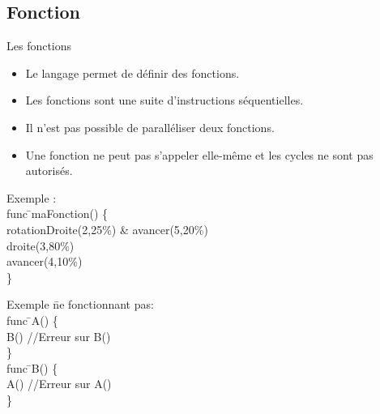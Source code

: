 \documentclass{bredelebeamer}
\begin{document}
	\subsection{Fonction} 
\begin{frame}{Les fonctions} 
\begin{itemize}
\item Le langage permet de définir des fonctions.
\item Les fonctions sont une suite d'instructions séquentielles.
\item Il n'est pas possible de paralléliser deux fonctions.
\item Une fonction ne peut pas s'appeler elle-même et les cycles ne sont pas autorisés.
\end{itemize}


\begin{tabbing}
Exemple : \=\\
	\>\color{Framarouge}func \=\color{black}maFonction\color{Framarouge}() \{\\ 
	\>\>\color{Framarouge}rotationDroite(\color{black}2\color{Framarouge},\color{Framagris}25\%\color{Framarouge}) \& 
	\color{Framarouge}avancer(\color{black}5\color{Framarouge},\color{Framagris}20\%\color{Framarouge})\\ 
	\>\>\color{Framarouge}droite(\color{black}3\color{Framarouge},\color{Framagris}80\%\color{Framarouge})\\ 
	\>\>\color{Framarouge}avancer(\color{black}4\color{Framarouge},\color{Framagris}10\%\color{Framarouge})\\ 
	\>\color{Framarouge}\}
\end{tabbing}
\begin{tabbing}
Exemple \=ne fonctionnant pas: \\
	\>\color{Framarouge}func \=\color{black}A\color{Framarouge}() \{\\ 
	\>\>\color{Framarouge}B() \color{black} //Erreur sur B() \\
	\>\color{Framarouge}\} \\
	\>\color{Framarouge}func \=\color{black}B\color{Framarouge}() \{\\ 
	\>\>\color{Framarouge}A()  \color{black} //Erreur sur A()\\
	\>\color{Framarouge}\}
\end{tabbing}

\end{frame}
\end{document}
